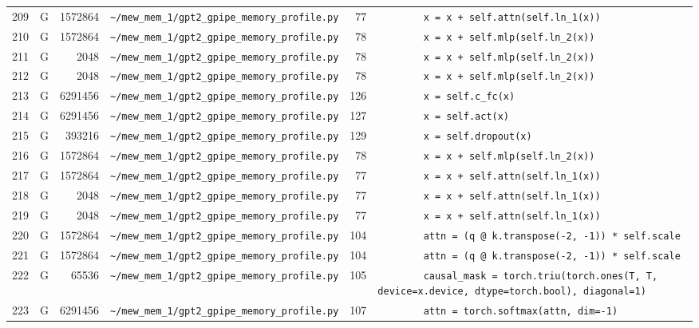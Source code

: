\documentclass{article}
\begin{document}
\begin{longtable}{r l r p{6.5cm} r p{7.0cm}}
209 & G & 1572864 & \lstinline|~/mew_mem_1/gpt2_gpipe_memory_profile.py| & 77 & \lstinline|        x = x + self.attn(self.ln_1(x))| \\
210 & G & 1572864 & \lstinline|~/mew_mem_1/gpt2_gpipe_memory_profile.py| & 78 & \lstinline|        x = x + self.mlp(self.ln_2(x))| \\
211 & G & 2048 & \lstinline|~/mew_mem_1/gpt2_gpipe_memory_profile.py| & 78 & \lstinline|        x = x + self.mlp(self.ln_2(x))| \\
212 & G & 2048 & \lstinline|~/mew_mem_1/gpt2_gpipe_memory_profile.py| & 78 & \lstinline|        x = x + self.mlp(self.ln_2(x))| \\
213 & G & 6291456 & \lstinline|~/mew_mem_1/gpt2_gpipe_memory_profile.py| & 126 & \lstinline|        x = self.c_fc(x)| \\
214 & G & 6291456 & \lstinline|~/mew_mem_1/gpt2_gpipe_memory_profile.py| & 127 & \lstinline|        x = self.act(x)| \\
215 & G & 393216 & \lstinline|~/mew_mem_1/gpt2_gpipe_memory_profile.py| & 129 & \lstinline|        x = self.dropout(x)| \\
216 & G & 1572864 & \lstinline|~/mew_mem_1/gpt2_gpipe_memory_profile.py| & 78 & \lstinline|        x = x + self.mlp(self.ln_2(x))| \\
217 & G & 1572864 & \lstinline|~/mew_mem_1/gpt2_gpipe_memory_profile.py| & 77 & \lstinline|        x = x + self.attn(self.ln_1(x))| \\
218 & G & 2048 & \lstinline|~/mew_mem_1/gpt2_gpipe_memory_profile.py| & 77 & \lstinline|        x = x + self.attn(self.ln_1(x))| \\
219 & G & 2048 & \lstinline|~/mew_mem_1/gpt2_gpipe_memory_profile.py| & 77 & \lstinline|        x = x + self.attn(self.ln_1(x))| \\
220 & G & 1572864 & \lstinline|~/mew_mem_1/gpt2_gpipe_memory_profile.py| & 104 & \lstinline|        attn = (q @ k.transpose(-2, -1)) * self.scale| \\
221 & G & 1572864 & \lstinline|~/mew_mem_1/gpt2_gpipe_memory_profile.py| & 104 & \lstinline|        attn = (q @ k.transpose(-2, -1)) * self.scale| \\
222 & G & 65536 & \lstinline|~/mew_mem_1/gpt2_gpipe_memory_profile.py| & 105 & \lstinline|        causal_mask = torch.triu(torch.ones(T, T, device=x.device, dtype=torch.bool), diagonal=1)| \\
223 & G & 6291456 & \lstinline|~/mew_mem_1/gpt2_gpipe_memory_profile.py| & 107 & \lstinline|        attn = torch.softmax(attn, dim=-1)| \\

\end{longtable}
\end{document}

